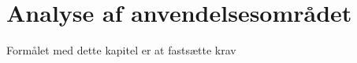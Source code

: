 \chapter{Analyse af anvendelsesområdet}
\label{chap:analyseafao}

Formålet med dette kapitel er at fastsætte krav 




